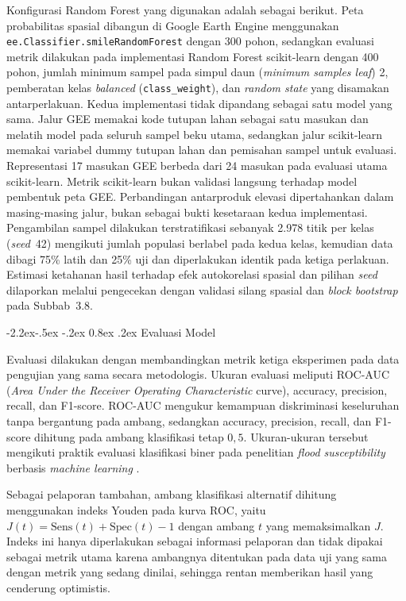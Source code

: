 \documentclass[12pt,a4paper]{article}
\makeatletter
\renewcommand\subsection{\@startsection{subsection}{2}{\z@}%
  {-2.2ex\@plus -.5ex \@minus -.2ex}%
  {0.8ex \@plus .2ex}%
  {\normalfont\normalsize\bfseries}}
\makeatother
\begin{document}
Konfigurasi Random Forest yang digunakan adalah sebagai berikut. Peta
probabilitas spasial dibangun di Google Earth Engine menggunakan
\texttt{ee.Classifier.smileRandomForest} dengan 300 pohon, sedangkan
evaluasi metrik dilakukan pada implementasi Random Forest scikit-learn
dengan 400 pohon, jumlah minimum sampel pada simpul daun
(\textit{minimum samples leaf}) 2,
pemberatan kelas \textit{balanced} (\texttt{class\_weight}), dan
\textit{random state} yang disamakan antarperlakuan. Kedua implementasi
tidak dipandang sebagai satu model yang sama. Jalur GEE memakai kode tutupan
lahan sebagai satu masukan dan melatih model pada seluruh
sampel beku utama, sedangkan jalur scikit-learn memakai variabel dummy
tutupan lahan dan pemisahan sampel untuk evaluasi. Representasi 17 masukan GEE berbeda dari 24 masukan pada evaluasi utama
scikit-learn. Metrik scikit-learn bukan validasi langsung terhadap
model pembentuk peta GEE. Perbandingan antarproduk elevasi dipertahankan
dalam masing-masing jalur, bukan sebagai bukti kesetaraan kedua implementasi.
Pengambilan sampel dilakukan terstratifikasi sebanyak 2.978 titik per kelas
(\textit{seed}~42) mengikuti jumlah populasi berlabel pada kedua kelas,
kemudian data dibagi 75\% latih dan 25\% uji dan diperlakukan identik pada
ketiga perlakuan. Estimasi ketahanan hasil terhadap efek autokorelasi
spasial dan pilihan \textit{seed} dilaporkan melalui pengecekan dengan
validasi silang spasial dan \textit{block bootstrap} pada Subbab~3.8.

\subsection{Evaluasi Model}

Evaluasi dilakukan dengan membandingkan metrik ketiga eksperimen pada data
pengujian yang sama secara metodologis. Ukuran evaluasi meliputi ROC-AUC
(\textit{Area Under the Receiver Operating Characteristic} curve),
accuracy, precision, recall, dan F1-score. ROC-AUC mengukur kemampuan
diskriminasi keseluruhan tanpa bergantung pada ambang, sedangkan accuracy,
precision, recall, dan F1-score dihitung pada ambang klasifikasi tetap
$0{,}5$. Ukuran-ukuran tersebut mengikuti praktik evaluasi klasifikasi biner
pada penelitian \textit{flood susceptibility} berbasis \textit{machine
learning} \citep{hakim2026}.

Sebagai pelaporan tambahan, ambang klasifikasi alternatif dihitung menggunakan
indeks Youden \citep{youden1950} pada kurva ROC, yaitu
$J(t)=\text{Sens}(t)+\text{Spec}(t)-1$ dengan ambang $t$ yang memaksimalkan
$J$. Indeks ini hanya diperlakukan sebagai informasi pelaporan dan tidak
dipakai sebagai metrik utama karena ambangnya ditentukan pada data uji yang
sama dengan metrik yang sedang dinilai, sehingga rentan memberikan hasil yang
cenderung optimistis.
\end{document}
